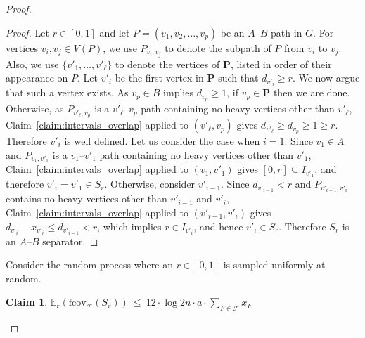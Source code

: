 \documentclass[11pt]{amsart}
\newtheorem{claim}{Claim}[theorem]
\begin{document}
\begin{proof}
\begin{proof}
        Let $r \in [0,1]$ and let $P = (v_1, v_2, \dots, v_p)$ be an $A$--$B$ path in $G$. For vertices $v_i,v_j \in V(P)$, we use $P_{v_i,v_j}$ to denote the subpath of $P$ from $v_i$ to $v_j$. Also, we use $\{v'_1, \dots, v'_\ell\}$ to denote the vertices of $\mathbf{P}$, listed in order of their appearance on $P$.
        Let $v'_i$ be the first vertex in $\mathbf{P}$ such that $d_{v'_i} \ge r$. We now argue that such a vertex exists. As $v_p \in B$ implies $d_{v_p} \ge 1$, if $v_p\in \mathbf{P}$ then we are done. Otherwise, as $P_{v'_\ell, v_p}$ is a $v'_\ell$--$v_p$ path containing no heavy vertices other than $v'_\ell$, Claim~\ref{claim:intervals_overlap} applied to $(v'_\ell, v_p)$ gives $d_{v'_\ell} \ge d_{v_p} \ge 1 \ge r$. Therefore $v'_i$ is well defined.
        Let us consider the case when $i=1$. Since $v_1 \in A$ and $P_{v_1, v'_1}$ is a $v_1$--$v'_1$ path containing no heavy vertices other than $v'_1$, Claim~\ref{claim:intervals_overlap} applied to $(v_1, v'_1)$ gives $[0,r] \subseteq I_{v'_1}$, and therefore $v'_i = v'_1 \in S_r$. 
        Otherwise, consider $v'_{i-1}$. Since $d_{v'_{i-1}} < r$ and $P_{v'_{i-1}, v'_i}$ contains no heavy vertices other than $v'_{i-1}$ and $v'_i$, Claim~\ref{claim:intervals_overlap} applied to $(v'_{i-1}, v'_i)$ gives $d_{v'_i} - x_{v'_i} \le d_{v'_{i-1}} < r$, which implies $r \in I_{v'_i}$, and hence $v'_i \in S_r$.
        Therefore $S_r$ is an $A$--$B$ separator.
    \end{proof}

    Consider the random process where an $r\in [0,1]$ is sampled uniformly at random.
    
    \begin{claim}\label{claim:S_r_has_small_cover}
        $\mathbb{E}_r(\mathrm{fcov}_{\mathcal{F}}(S_r))\ \leq\ 12 \cdot \log 2n \cdot a \cdot \sum_{F \in \mathcal{F}} x_F$
    \end{claim}
    

\end{proof}
\end{document}
